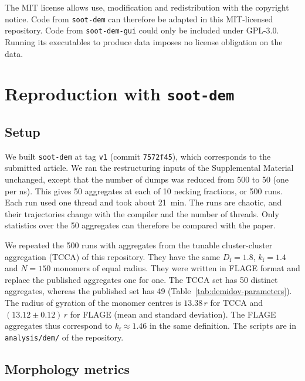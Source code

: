 \documentclass[11pt,a4paper]{article}
\newcommand{\Df}{D_\text{f}}
\begin{document}
The MIT license allows use, modification and redistribution with the copyright notice.
Code from \texttt{soot-dem} can therefore be adapted in this MIT-licensed repository.
Code from \texttt{soot-dem-gui} could only be included under GPL-3.0.
Running its executables to produce data imposes no license obligation on the data.

\section{Reproduction with \texttt{soot-dem}}
\label{sec:repro}

\subsection{Setup}

We built \texttt{soot-dem} at tag \texttt{v1} (commit \texttt{7572f45}), which corresponds to the submitted article.
We ran the restructuring inputs of the Supplemental Material unchanged, except that the number of dumps was reduced from 500 to 50 (one per \si{\nano\second}).
This gives 50 aggregates at each of 10 necking fractions, or 500 runs.
Each run used one thread and took about \SI{21}{\minute}.
The runs are chaotic, and their trajectories change with the compiler and the number of threads.
Only statistics over the 50 aggregates can therefore be compared with the paper.

We repeated the 500 runs with aggregates from the tunable cluster-cluster aggregation (TCCA) of this repository.
They have the same $\Df = 1.8$, $k_\text{f} = 1.4$ and $N = 150$ monomers of equal radius.
They were written in FLAGE format and replace the published aggregates one for one.
The TCCA set has 50 distinct aggregates, whereas the published set has 49 (Table~\ref{tab:demidov-parameters}).
The radius of gyration of the monomer centres is $13.38\,r$ for TCCA and $(13.12 \pm 0.12)\,r$ for FLAGE (mean and standard deviation).
The FLAGE aggregates thus correspond to $k_\text{f} \approx 1.46$ in the same definition.
The scripts are in \texttt{analysis/dem/} of the repository.

\subsection{Morphology metrics}
\end{document}
